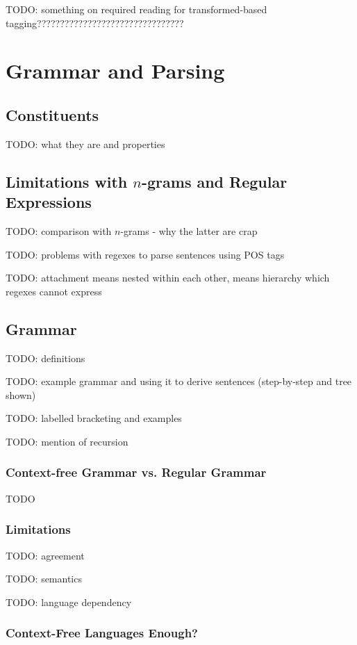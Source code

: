 \documentclass{article}
\begin{document}
TODO: something on required reading for transformed-based tagging????????????????????????????????

\section{Grammar and Parsing}

\subsection{Constituents}

TODO: what they are and properties

\subsection{Limitations with $n$-grams and Regular Expressions}

TODO: comparison with $n$-grams - why the latter are crap

TODO: problems with regexes to parse sentences using POS tags

TODO: attachment means nested within each other, means hierarchy which regexes cannot express

\subsection{Grammar}

TODO: definitions

TODO: example grammar and using it to derive sentences (step-by-step and tree shown)

TODO: labelled bracketing and examples

TODO: mention of recursion

\subsubsection{Context-free Grammar vs. Regular Grammar}

TODO

\subsubsection{Limitations}

TODO: agreement

TODO: semantics

TODO: language dependency

\subsubsection{Context-Free Languages Enough?}
\end{document}
